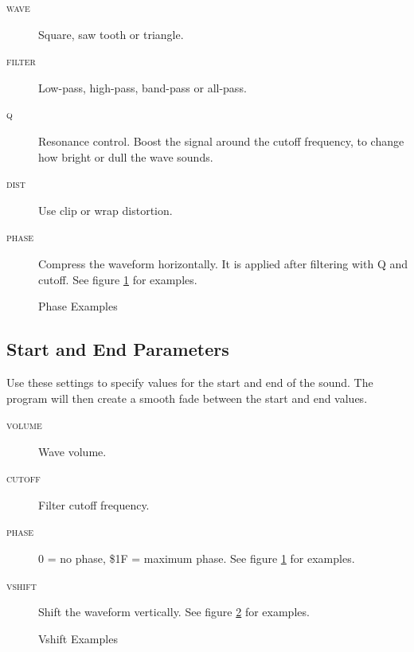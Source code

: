 \begin{description}
\item[\textsc{wave}] Square, saw tooth or triangle.
\item[\textsc{filter}] Low-pass, high-pass, band-pass or all-pass.
\item[\textsc{q}] Resonance control. Boost the signal around the cutoff frequency, to change how bright or dull the wave sounds.
\item[\textsc{dist}] Use clip or wrap distortion.
\item[\textsc{phase}] \label{phase}
Compress the waveform horizontally. It is applied after filtering with Q and cutoff. See figure \ref{fig:phasing} for examples.
\end{description}

\begin{figure}[hbtp]
	\centering
	\qquad

	\qquad
	\caption{Phase Examples}
	\label{fig:phasing}
\end{figure}

\subsection{Start and End Parameters}

Use these settings to specify values for the start and end of the sound. The program will then create a smooth fade between the start and end values.

\begin{description}
\item[\textsc{volume}] Wave volume.
\item[\textsc{cutoff}] Filter cutoff frequency.
\item[\textsc{phase}] 0 = no phase, \$1F = maximum phase. See figure \ref{fig:phasing} for examples.
\item[\textsc{vshift}] Shift the waveform vertically. See figure \ref{fig:vshift} for examples.
\end{description}

\begin{figure}[htpb]
	\centering


	\caption{Vshift Examples}
	\label{fig:vshift}
\end{figure}

